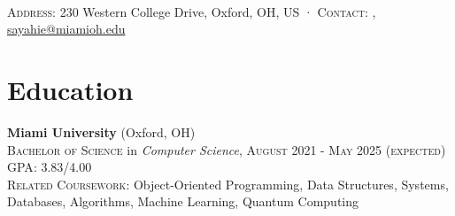 \documentclass[letterpaper,8pt]{article} %
\begin{document}
\pagestyle{empty} %


\par
{\\

\footnotesize{
\textsc{Address:} 230 Western College Drive, Oxford, OH, US
·
\textsc{Contact:} \href{tel:+1-513-484-0972}{\color{black}{+1 (513) 484-0972}}, \href{mailto:sayahie@miamioh.edu}{\color{black}sayahie@miamioh.edu}\\
}\normalsize
\bigskip\par} %




\section{Education}

\textbf{Miami University} (Oxford, OH)\\
\textsc{Bachelor of Science} in \emph{Computer Science}, \textsc{August 2021 - May 2025 (expected)}\\
\footnotesize \textsc{GPA}: 3.83/4.00\normalsize \\
\footnotesize \textsc{Related Coursework}: \scriptsize{Object-Oriented Programming, Data Structures, Systems, Databases, Algorithms, Machine Learning, Quantum Computing}\\
\end{document}
